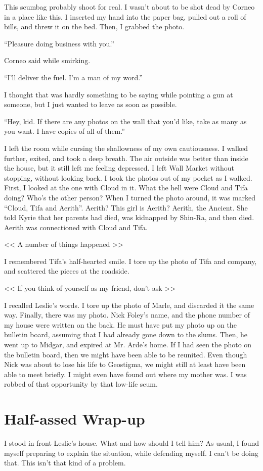 \documentclass[oneside]{book}
\begin{document}
This scumbag probably shoot for real. I wasn’t about to be shot dead by Corneo in a place like this. I inserted my hand into the paper bag, pulled out a roll of bills, and threw it on the bed. Then, I grabbed the photo.

“Pleasure doing business with you.”

Corneo said while smirking.

“I’ll deliver the fuel. I’m a man of my word.”

I thought that was hardly something to be saying while pointing a gun at someone, but I just wanted to leave as soon as possible.

“Hey, kid. If there are any photos on the wall that you’d like, take as many as you want. I have copies of all of them.”

I left the room while cursing the shallowness of my own cautiousness. I walked further, exited, and took a deep breath. The air outside was better than inside the house, but it still left me feeling depressed. I left Wall Market without stopping, without looking back. I took the photos out of my pocket as I walked. First, I looked at the one with Cloud in it. What the hell were Cloud and Tifa doing? Who’s the other person? When I turned the photo around, it was marked “Cloud, Tifa and Aerith”. Aerith? This girl is Aerith? Aerith, the Ancient. She told Kyrie that her parents had died, was kidnapped by Shin-Ra, and then died. Aerith was connectioned with Cloud and Tifa.

<< A number of things happened >>

I remembered Tifa’s half-hearted smile. I tore up the photo of Tifa and company, and scattered the pieces at the roadside.

<< If you think of yourself as my friend, don’t ask >>

I recalled Leslie’s words. I tore up the photo of Marle, and discarded it the same way. Finally, there was my photo. Nick Foley’s name, and the phone number of my house were written on the back. He must have put my photo up on the bulletin board, assuming that I had already gone down to the slums. Then, he went up to Midgar, and expired at Mr. Arde’s home. If I had seen the photo on the bulletin board, then we might have been able to be reunited. Even though Nick was about to lose his life to Geostigma, we might still at least have been able to meet briefly. I might even have found out where my mother was. I was robbed of that opportunity by that low-life scum.

\chapter{Half-assed Wrap-up}
I stood in front Leslie’s house. What and how should I tell him? As usual, I found myself preparing to explain the situation, while defending myself. I can’t be doing that. This isn’t that kind of a problem.
\end{document}

